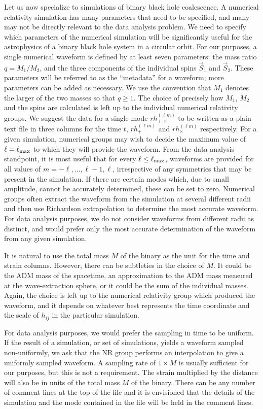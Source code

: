 \documentclass[prd,preprintnumbers,superscriptaddress,eqsecnum]{revtex4}
\numberwithin{equation}{section}
\begin{document}
Let us now specialize to simulations of binary black hole coalescence.
A numerical relativity simulation has many parameters that need to be
specified, and many may not be directly relevant to the data
analysis problem.  We need to specify which parameters of the
numerical simulation will be significantly useful for the astrophysics
of a binary black hole system in a circular orbit.  For our purposes,
a single numerical waveform is defined by at least seven parameters:
the mass ratio $q = M_1/M_2$, and the three components of the
individual spins $\vec{S}_1$ and $\vec{S}_2$.  These parameters will
be referred to as the ``metadata'' for a waveform; more parameters can
be added as necessary. We use the convention that $M_1$ denotes the
larger of the two masses so that $q\geq 1$.  The choice of precisely
how $M_1$, $M_2$ and the spins are calculated is left up to the
individual numerical relativity groups.  We suggest the data for a
single mode $rh_{+,\times}^{(\ell m)}$ to be written as a plain text
file in three columns for the time $t$, $rh_+^{(\ell m)}$ and
$rh_\times^{(\ell m)}$ respectively.  For a given simulation,
numerical groups may wish to decide the maximum value of $\ell =
\ell_{\rm max}$ to which they will provide the waveform. From the data
analysis standpoint, it is most useful that for every $\ell \leq
\ell_{\rm max}$, waveforms are provided for all values of $m = -\ell,
\ldots, \ell - 1, \ell$, irrespective of any symmetries that may be
present in the simulation.  If there are certain modes which, due to
small amplitude, cannot be accurately determined, these can be set to
zero.  Numerical groups often extract the waveform from the simulation
at several different radii and then use Richardson extrapolation to
determine the most accurate waveform.  For data analysis purposes, we
do not consider waveforms from different radii as distinct, and would
prefer only the most accurate determination of the waveform from any
given simulation.

It is natural to use the total mass $M$ of the binary as the unit for
the time and strain columns.  However, there can be subtleties in the
choice of $M$.  It could be the ADM mass of the spacetime, an
approximation to the ADM mass measured at the wave-extraction sphere,
or it could be the sum of the individual masses.  Again, the choice is
left up to the numerical relativity group which produced the waveform,
and it depends on whatever best represents the time coordinate and the
scale of $h_{ij}$ in the particular simulation.

For data analysis purposes, we would prefer the sampling in time to be
uniform.  If the result of a simulation, or set of simulations, yields a
waveform sampled non-uniformly, we ask that the NR group performs an
interpolation to give a uniformly sampled waveform.  A sampling rate
of $1\times M$ is usually sufficient for our purposes, but this is not
a requirement.  The strain multiplied by the distance will also be in
units of the total mass $M$ of the binary.  There can be any number of
comment lines at the top of the file and it is envisioned that the
details of the simulation and the mode contained in the file will be
held in the comment lines.
\end{document}
